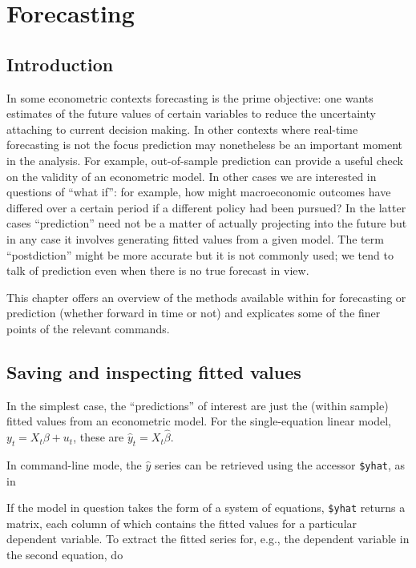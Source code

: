 \chapter{Forecasting}
\label{chap-forecast}

\section{Introduction}
\label{sec:fcast-intro}

In some econometric contexts forecasting is the prime objective: one
wants estimates of the future values of certain variables to reduce
the uncertainty attaching to current decision making.  In other
contexts where real-time forecasting is not the focus prediction
may nonetheless be an important moment in the analysis.  For example,
out-of-sample prediction can provide a useful check on the validity of
an econometric model.  In other cases we are interested in questions
of ``what if'': for example, how might macroeconomic outcomes have
differed over a certain period if a different policy had been pursued?
In the latter cases ``prediction'' need not be a matter of actually
projecting into the future but in any case it involves generating
fitted values from a given model.  The term ``postdiction'' might be
more accurate but it is not commonly used; we tend to talk of
prediction even when there is no true forecast in view.

This chapter offers an overview of the methods available within
 for forecasting or prediction (whether forward in time or
not) and explicates some of the finer points of the relevant commands.

\section{Saving and inspecting fitted values}
\label{sec:fcast-fitted}

In the simplest case, the ``predictions'' of interest are just the
(within sample) fitted values from an econometric model.  For the
single-equation linear model, $y_t = X_t \beta + u_t$, these are
$\hat{y}_t = X_t \hat{\beta}$.  

In command-line mode, the $\hat{y}$ series can be retrieved using the
accessor \verb|$yhat|, as in
%
% 
If the model in question takes the form of a system of equations,
\verb|$yhat| returns a matrix, each column of which contains the
fitted values for a particular dependent variable.  To extract
the fitted series for, e.g., the dependent variable in the second
equation, do
%
% 



